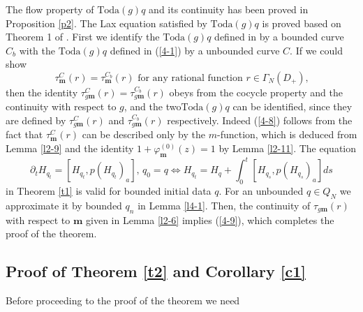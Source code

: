 \documentclass[a4paper]{article}%
\begin{document}
The flow property of $\mathrm{Toda}\left(  g\right)  q$ and its continuity has
been proved in Proposition \ref{p2}. The Lax equation satisfied by
$\mathrm{Toda}\left(  g\right)  q$ is proved based on Theorem 1 of \cite{z}.
First we identify the $\mathrm{Toda}\left(  g\right)  q$ defined in \cite{z}
by a bounded curve $C_{b}$ with the $\mathrm{Toda}\left(  g\right)  q$ defined
in (\ref{4-1}) by a unbounded curve $C$. If we could show%
\begin{equation}
\tau_{\boldsymbol{m}}^{C}\left(  r\right)  =\tau_{\boldsymbol{m}}^{C_{b}%
}\left(  r\right)  \text{ \ for any rational function }r\in\Gamma_{N}\left(
D_{+}\right)  \text{,} \label{4-8}%
\end{equation}
then the identity $\tau_{g\boldsymbol{m}}^{C}\left(  r\right)  =\tau
_{g\boldsymbol{m}}^{C_{b}}\left(  r\right)  $ obeys from the cocycle property
and the continuity with respect to $g$, and the two$\mathrm{Toda}\left(
g\right)  q$ can be identified, since they are defined by $\tau
_{g\boldsymbol{m}}^{C}\left(  r\right)  $ and $\tau_{g\boldsymbol{m}}^{C_{b}%
}\left(  r\right)  $ respectively. Indeed (\ref{4-8}) follows from the fact
that $\tau_{\boldsymbol{m}}^{C}\left(  r\right)  $ can be described only by
the $m$-function, which is deduced from Lemma \ref{l2-9} and the identity
$1+\varphi_{\boldsymbol{m}}^{\left(  0\right)  }\left(  z\right)  =1$ by Lemma
\ref{l2-11}. The equation%
\begin{equation}
\partial_{t}H_{q_{t}}=\left[  H_{q_{t}},p\left(  H_{q_{t}}\right)
_{a}\right]  \text{, }q_{0}=q\Longleftrightarrow H_{q_{t}}=H_{q}+\int_{0}%
^{t}\left[  H_{q_{s}},p\left(  H_{q_{s}}\right)  _{a}\right]  ds \label{4-9}%
\end{equation}
in Theorem \ref{t1} is valid for bounded initial data $q$. For an unbounded
$q\in Q_{N}$ we approximate it by bounded $q_{n}$ in Lemma \ref{l4-1}. Then,
the continuity of $\tau_{g\boldsymbol{m}}\left(  r\right)  $ with respect to
$\boldsymbol{m}$ given in Lemma \ref{l2-6} implies (\ref{4-9}), which
completes the proof of the theorem.

\subsection{Proof of Theorem \ref{t2} and Corollary \ref{c1}}

Before proceeding to the proof of the theorem we need
\end{document}
